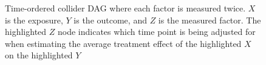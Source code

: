 \documentclass[
  letterpaper,
  DIV=11,
  numbers=noendperiod]{scrartcl}
\begin{document}
\begin{figure}

\begin{minipage}[t]{0.50\linewidth}

{\centering 


}

\end{minipage}%
%
\begin{minipage}[t]{0.50\linewidth}

{\centering 


}

\end{minipage}%

\caption{\label{fig-3}Time-ordered collider DAG where each factor is
measured twice. \(X\) is the exposure, \(Y\) is the outcome, and \(Z\)
is the measured factor. The highlighted \(Z\) node indicates which time
point is being adjusted for when estimating the average treatment effect
of the highlighted \(X\) on the highlighted \(Y\)}

\end{figure}
\end{document}
